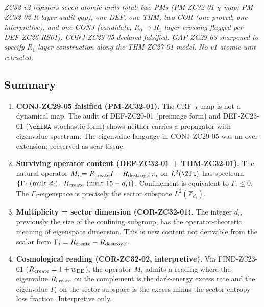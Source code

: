 \documentclass[12pt, a4paper]{article}
\begin{document}
\textit{ZC32 v2 registers seven atomic units total: two PMs
(PM-ZC32-01 $\chi$-map; PM-ZC32-02 R-layer audit gap), one
DEF, one THM, two COR (one proved, one interpretive), and
one CONJ (candidate, $R_0 \to R_1$ layer-crossing flagged
per DEF-ZC26-RS01). CONJ-ZC29-05 declared falsified.
GAP-ZC29-03 sharpened to specify $R_1$-layer construction
along the THM-ZC27-01 model. No v1 atomic unit retracted.}

\subsection{Summary}
\label{sec:summary}

\begin{enumerate}[leftmargin=*, label=\arabic*., noitemsep]

\item \textbf{CONJ-ZC29-05 falsified (PM-ZC32-01).}
The CRF $\chi$-map is not a dynamical map. The audit of
DEF-ZC20-01 (preimage form) and DEF-ZC23-01 ($\chiNA$
stochastic form) shows neither carries a propagator with
eigenvalue spectrum. The eigenvalue language in CONJ-ZC29-05
was an over-extension; preserved as scar tissue.

\item \textbf{Surviving operator content (DEF-ZC32-01 +
THM-ZC32-01).}
The natural operator $M_i = R_{\rm create} I -
R_{{\rm destroy},i}\,\pi_i$ on $L^2(\Zft)$ has spectrum
$\{\Gamma_i\ (\mathrm{mult}\ d_i),\ R_{\rm create}\
(\mathrm{mult}\ 15 - d_i)\}$. Confinement is equivalent to
$\Gamma_i \leq 0$. The $\Gamma_i$-eigenspace is precisely the
sector subspace $L^2(\mathbb{Z}_{d_i})$.

\item \textbf{Multiplicity = sector dimension (COR-ZC32-01).}
The integer $d_i$, previously the size of the confining
subgroup, has the operator-theoretic meaning of eigenspace
dimension. This is new content not derivable from the
scalar form $\Gamma_i = R_{\rm create} - R_{{\rm destroy},i}$.

\item \textbf{Cosmological reading (COR-ZC32-02,
interpretive).}
Via FIND-ZC23-01 ($R_{\rm create} = 1 + w_{\rm DE}$), the
operator $M_i$ admits a reading where the eigenvalue
$R_{\rm create}$ on the complement is the dark-energy excess
rate and the eigenvalue $\Gamma_i$ on the sector subspace is
the excess minus the sector entropy-loss fraction.
Interpretive only.


\end{enumerate}
\end{document}
